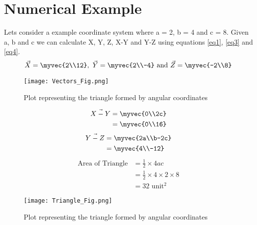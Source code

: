 \documentclass[journal,12pt]{IEEEtran}
\begin{document}
\section{Numerical Example}
Lets consider a example coordinate system where a = 2, b = 4 and c = 8. Given a, b and c we can calculate X, Y, Z, X-Y and Y-Z using equations \ref{eq1}, \ref{eq3} and \ref{eq4}.\\
\begin{align}
\vec{X} = \myvec{2\\12}, \text{ } \vec{Y} = \myvec{2\\-4} \text{ and } \vec{Z} = \myvec{-2\\8}
\label{eq1}
\end{align}
\begin{figure}[h]
	\centering
	\texttt{[image: Vectors\_Fig.png]}
	\caption{Plot representing the triangle formed by angular coordinates}
	\label{fig1}
\end{figure}
\begin{align}
\begin{split}
\vec{X-Y} & = \myvec{0\\2c} \\
& = \myvec{0\\16}
\end{split}
\label{eq7}
\end{align}
\begin{align}
\begin{split}
\vec{Y-Z} & = \myvec{2a\\b-2c} \\
& = \myvec{4\\-12}
\end{split}
\label{eq8}
\end{align}
\begin{align}
\text{Area of Triangle} & = \frac{1}{2} \times 4ac \\
& = \frac{1}{2} \times 4 \times 2 \times 8 \\
& = 32 \text{ unit}^2
\label{eq9}
\end{align}
\begin{figure}[h]
	\centering
	\texttt{[image: Triangle\_Fig.png]}
	\caption{Plot representing the triangle formed by angular coordinates}
	\label{fig2}
\end{figure}
\end{document}
